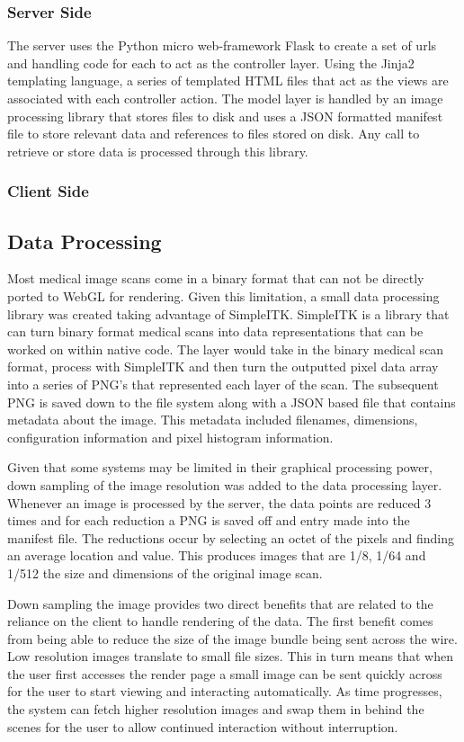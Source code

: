 \documentclass{acm_proc_article-sp}
\begin{document}
\subsubsection{Server Side}
	The server uses the Python micro web-framework Flask to create a set of urls and handling code for each to act as the controller layer.  Using the Jinja2 templating language, a series of templated HTML files that act as the views are associated with each controller action.  The model layer is handled by an image processing library that stores files to disk and uses a JSON formatted manifest file to store relevant data and references to files stored on disk.  Any call to retrieve or store data is processed through this library.

\subsubsection{Client Side}

\subsection{Data Processing}

Most medical image scans come in a binary format that can not be directly ported to WebGL for rendering.  Given this limitation, a small data processing library was created taking advantage of SimpleITK.  SimpleITK is a library that can turn binary format medical scans into data representations that can be worked on within native code.  The layer would take in the binary medical scan format, process with SimpleITK and then turn the outputted pixel data array into a series of PNG's that represented each layer of the scan.  The subsequent PNG is saved down to the file system along with a JSON based file that contains metadata about the image.  This metadata included filenames, dimensions, configuration information and pixel histogram information.

Given that some systems may be limited in their graphical processing power, down 
sampling of the image resolution was added to the data processing layer.  Whenever an image is processed by the server, the data points are reduced 3 times and for each reduction a PNG is saved off and entry made into the manifest file.  The reductions occur by selecting an octet of the pixels and finding an average location and value.  This produces images that are 1/8, 1/64 and 1/512 the size and dimensions of the original image scan.

Down sampling the image provides two direct benefits that are related to the reliance on the client to handle rendering of the data.  The first benefit comes from being able to reduce the size of the image bundle being sent across the wire.  Low resolution images translate to small file sizes.  This in turn means that when the user first accesses the render page a small image can be sent quickly across for the user to start viewing and interacting automatically.  As time progresses, the system can fetch higher resolution images and swap them in behind the scenes for the user to allow continued interaction without interruption.  
\end{document}

